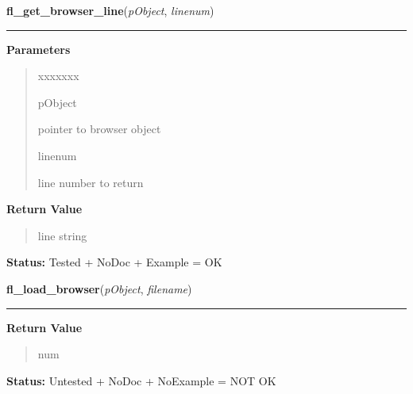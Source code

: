 \hspace{.8\funcindent}\begin{boxedminipage}{\funcwidth}

    \raggedright \textbf{fl\_get\_browser\_line}(\textit{pObject}, \textit{linenum})

    \vspace{-1.5ex}

    \rule{\textwidth}{0.5\fboxrule}
\setlength{\parskip}{2ex}
\setlength{\parskip}{1ex}
      \textbf{Parameters}
      \vspace{-1ex}

      \begin{quote}
        \begin{Ventry}{xxxxxxx}

          \item[pObject]

          pointer to browser object

          \item[linenum]

          line number to return

        \end{Ventry}

      \end{quote}

      \textbf{Return Value}
    \vspace{-1ex}

      \begin{quote}
      line string

      \end{quote}

\textbf{Status:} Tested + NoDoc + Example = OK



    \end{boxedminipage}

    \label{xformslib:library:fl_load_browser}

    \vspace{0.5ex}

\hspace{.8\funcindent}\begin{boxedminipage}{\funcwidth}

    \raggedright \textbf{fl\_load\_browser}(\textit{pObject}, \textit{filename})

    \vspace{-1.5ex}

    \rule{\textwidth}{0.5\fboxrule}
\setlength{\parskip}{2ex}
\setlength{\parskip}{1ex}
      \textbf{Return Value}
    \vspace{-1ex}

      \begin{quote}
      num

      \end{quote}

\textbf{Status:} Untested + NoDoc + NoExample = NOT OK



    \end{boxedminipage}

